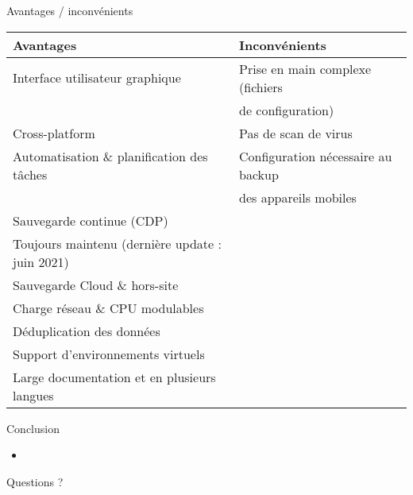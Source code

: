 \documentclass[aspectratio=169]{beamer}
\begin{document}
\begin{frame}{Avantages / inconvénients}
    \begin{center}\small
     \begin{tabular}{|l|l|}
     \hline
      \textbf{Avantages} & \textbf{Inconvénients} \\
     \hline
     \hline
        Interface utilisateur graphique & Prise en main complexe (fichiers \\ 
                                        & de configuration) \\
     \hline
     Cross-platform & Pas de scan de virus \\
     \hline
     Automatisation \& planification des tâches & Configuration nécessaire au backup \\ 
                                                & des appareils mobiles\\
     \hline
     Sauvegarde continue (CDP) & \\
     \hline
     Toujours maintenu (dernière update : juin 2021) & \\
     \hline
     Sauvegarde Cloud \& hors-site & \\
     \hline
     Charge réseau \& CPU modulables & \\
     \hline
     Déduplication des données & \\
     \hline
     Support d'environnements virtuels & \\
     \hline
     Large documentation et en plusieurs langues & \\
     \hline
     \end{tabular}

    \end{center}
\end{frame}

\begin{frame}{Conclusion}
 \begin{itemize}
  \item 
 \end{itemize}
\end{frame}

\begin{frame}{Questions ?}
\end{frame}
\end{document}
